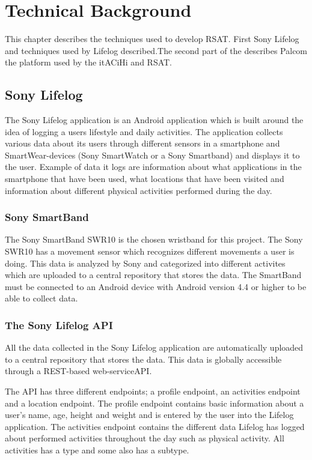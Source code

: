 \documentclass{cslthse-msc}
\begin{document}
\chapter[Technical Background]{Technical Background}

This chapter describes the techniques used to develop RSAT. First Sony Lifelog and techniques used by Lifelog described.The second part of the describes Palcom the platform used by the itACiHi and RSAT. 

\section{Sony Lifelog}

The Sony Lifelog application is an Android application which is built around the idea of logging a users lifestyle and daily activities\cite{LifeLogDescr}. The application collects various data about its users through different sensors in a smartphone and SmartWear-devices (Sony SmartWatch or a Sony Smartband) and displays it to the user. Example of data it logs are information about what applications in the smartphone that have been used, what locations that have been visited and information about different physical activities performed during the day.  

\subsection{Sony SmartBand}

The Sony SmartBand SWR10 is the chosen wristband for this project. The Sony SWR10 has a movement sensor which recognizes different movements a user is doing\cite{SWR10}. This data is analyzed by Sony and categorized into different activites which are uploaded to a central repository that stores the data. The SmartBand must be connected to an Android device with Android version 4.4 or higher to be able to collect data. 

\subsection{The Sony Lifelog API} 
All the data collected in the Sony Lifelog application are automatically uploaded to a central repository that stores the data. This data is globally accessible through a REST-based web-serviceAPI\cite{LifeLogDescr}. 

The API has three different endpoints; a profile endpoint, an activities endpoint and a location endpoint. The profile endpoint contains basic information about a user's name, age, height and weight and is entered by the user into the Lifelog application. The activities endpoint contains the different data Lifelog has logged about performed activities throughout the day such as physical activity. All activities has a type and some also has a subtype. 
\end{document}
